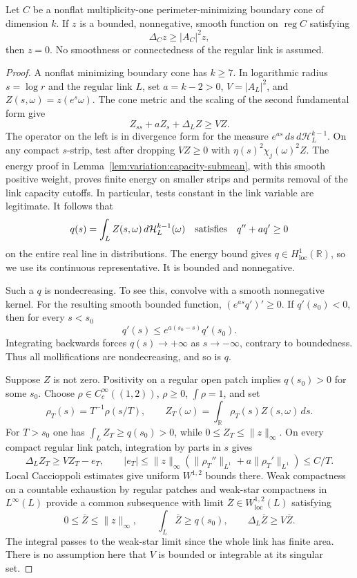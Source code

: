 \begin{lemma}
\label{lem:variation:cone-liouville}
Let $C$ be a nonflat multiplicity-one perimeter-minimizing boundary
cone of dimension $k$.  If $z$ is a bounded, nonnegative, smooth
function on $\operatorname{reg}C$ satisfying
\[
 \Delta_C z\geq |A_C|^2z,
\]
then $z=0$.  No smoothness or connectedness of the regular link is
assumed.
\end{lemma}

\begin{proof}
A nonflat minimizing boundary cone has $k\geq7$.
In logarithmic radius $s=\log r$ and the regular link $L$, set
$a=k-2>0$, $V=|A_L|^2$, and $Z(s,\omega)=z(e^s\omega)$.
The cone metric and the scaling of the second fundamental form give
\[
 Z_{ss}+aZ_s+\Delta_L Z\geq VZ.
\]
The operator on the left is in divergence form for the measure
$e^{as}\,ds\,d\mathcal H^{k-1}_L$.
On any compact $s$-strip, test after dropping $VZ\geq0$ with
$\eta(s)^2\chi_j(\omega)^2 Z$.
The energy proof in Lemma~\ref{lem:variation:capacity-submean}, with
this smooth positive weight, proves finite energy on smaller strips
and permits removal of the link capacity cutoffs.  In particular,
tests constant in the link variable are legitimate.  It follows that
\[
 q(s)=\int_LZ(s,\omega)\,d\mathcal H^{k-1}_L(\omega)
 \quad\hbox{satisfies}\quad q''+a q'\geq0
\]
on the entire real line in distributions.  The energy bound gives
$q\in H^1_{\mathrm{loc}}(\mathbb R)$, so we use its continuous
representative.  It is bounded and nonnegative.

Such a $q$ is nondecreasing.  To see this, convolve with a smooth
nonnegative kernel.  For the resulting smooth bounded function,
$(e^{as}q')'\geq0$.  If $q'(s_0)<0$, then for every $s<s_0$
\[
 q'(s)\leq e^{a(s_0-s)}q'(s_0).
\]
Integrating backwards forces $q(s)\to+\infty$ as $s\to-\infty$,
contrary to boundedness.  Thus all mollifications are nondecreasing,
and so is $q$.

Suppose $Z$ is not zero.  Positivity on a regular open patch implies
$q(s_0)>0$ for some $s_0$.  Choose
$\rho\in C_c^\infty((1,2))$, $\rho\geq0$, $\int\rho=1$, and set
\[
 \rho_T(s)=T^{-1}\rho(s/T),\qquad
 Z_T(\omega)=\int_{\mathbb R}\rho_T(s)Z(s,\omega)\,ds.
\]
For $T>s_0$ one has $\int_L Z_T\geq q(s_0)>0$, while
$0\leq Z_T\leq\|z\|_\infty$.  On every compact regular link patch,
integration by parts in $s$ gives
\[
 \Delta_LZ_T\geq VZ_T-e_T,
 \qquad
 |e_T|\leq\|z\|_\infty
       (\|\rho_T''\|_{L^1}+a\|\rho_T'\|_{L^1})
       \leq C/T.
\]
Local Caccioppoli estimates give uniform $W^{1,2}$ bounds there.
Weak compactness on a countable exhaustion by regular patches and
weak-star compactness in $L^\infty(L)$ provide a common subsequence with limit
$\overline Z\in W^{1,2}_{\mathrm{loc}}(L)$ satisfying
\[
 0\leq\overline Z\leq\|z\|_\infty,\qquad
 \int_L\overline Z\geq q(s_0),\qquad
 \Delta_L\overline Z\geq V\overline Z.
\]
The integral passes to the weak-star limit since the whole link has
finite area.  There is no assumption here that $V$ is bounded or
integrable at its singular set.


\end{proof}

